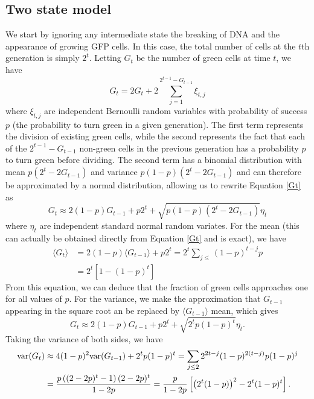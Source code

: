 \documentclass{article}
\begin{document}
\subsection{Two state model}
We start by ignoring any intermediate state the breaking of DNA and the appearance of growing GFP cells. In this case, the total number of cells at the $t$th generation is simply $2^t$. Letting $G_t$ be the number of green cells at time $t$, we have
\begin{equation}\label{Gt}
G_t = 2G_t +2 \sum_{j=1}^{2^{t-1} - G_{t-1}}\xi_{t,j}
\end{equation}
where $\xi_{t,j}$ are independent Bernoulli  random variables with probability of success $p$ (the probability to turn green in a given generation).  The first term represents the division of existing green cells, while the second represents the fact that each of the $2^{t-1}-G_{t-1}$ non-green cells in the previous generation has a probability $p$ to turn green before dividing. The second term has a binomial distribution with mean $p(2^{t} - 2G_{t-1})$ and variance $p(1-p)(2^{t} - 2G_{t-1})$ and can therefore be approximated by a normal distribution, allowing us to rewrite Equation \ref{Gt} as
\begin{equation}
G_t \approx 2(1-p)G_{t-1} + p2^{t} + \sqrt{p(1-p)(2^{t} - 2G_{t-1})}\eta_t
\end{equation}
where $\eta_t$ are independent standard normal random variates. For the mean (this can actually be obtained directly from Equation \ref{Gt} and is exact), we have
\begin{align}
\langle G_t \rangle &=  2(1-p)\langle G_{t-1} \rangle  + p2^{t}  = 2^t\sum_{j\le} (1-p)^{t-j}p\\
&= 2^t \left[1-(1-p)^t\right]
\end{align}
From this equation, we can deduce that the fraction of green cells approaches one for all values of $p$. 
For the variance, we make the approximation that $G_{t-1}$ appearing in the square root an be replaced by $\langle G_{t-1} \rangle$ mean, which gives
\begin{equation}
G_t \approx 2(1-p)G_{t-1} + p2^{t} + \sqrt{2^tp(1-p)^t}\eta_t.
\end{equation}
Taking the variance of both sides, we have 
\begin{align}
{\rm var}(G_t) &\approx 4(1-p)^2{\rm var}(G_{t-1}) + 2^tp(1-p)^t  = \sum_{j\le 2} 2^{2t-j} (1-p)^{2(t-j)} p(1-p)^j\\
&= \frac{p \left((2-2 p)^t-1\right) (2-2 p)^t}{1-2 p} = \frac{p}{1-2p} \left[\left(2^t (1-p)\right)^2 - 2^t (1-p)^t \right].
\end{align}
\end{document}
